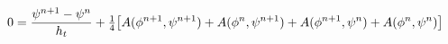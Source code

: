 \documentclass[preview]{standalone}
\begin{document}
\begin{align*}
\special{dvisvgm:raw <g id='unique000'>}0=\frac{\psi^{n+1}-\psi^n}{h_t}+\tfrac14\big[A(\phi^{n+1},\psi^{n+1})+A(\phi^n,\psi^{n+1})+A(\phi^{n+1},\psi^n)+A(\phi^n,\psi^n)\big]\special{dvisvgm:raw </g>}
\end{align*}
\end{document}
